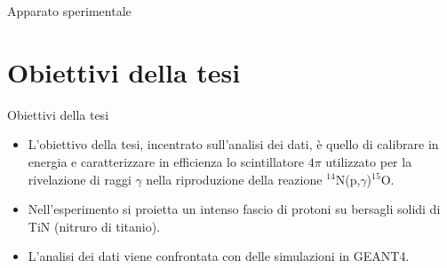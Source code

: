 \documentclass [xcolor=svgnames] {beamer}
\begin{document}
\begin{frame}{Apparato sperimentale}
\end{frame}

	\section{Obiettivi della tesi}
	\begin{frame}{Obiettivi della tesi}
		\begin{itemize}
			\item<1-> L'obiettivo della tesi, incentrato sull'analisi dei dati, è quello di calibrare in energia e caratterizzare in efficienza lo scintillatore $4\pi$ utilizzato per la rivelazione di raggi $\gamma$ nella riproduzione della reazione $^{14}$N(p,$\gamma$)$^{15}$O. 
			\item<2-> Nell'esperimento si proietta un intenso fascio di protoni su bersagli solidi di TiN (nitruro di titanio).  
			\item<3-> L'analisi dei dati viene confrontata con delle simulazioni in GEANT4.
		\end{itemize}
	\end{frame}
\end{document}
